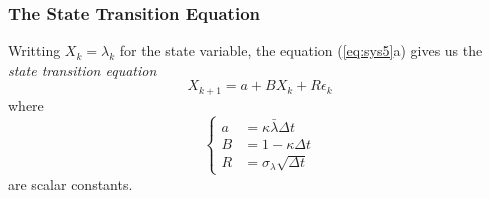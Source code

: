 \documentclass{article}
\theoremstyle{definition}
\theoremstyle{remark}
\begin{document}
\subsubsection{The State Transition Equation}

Writting $X_k=\lambda_k$ for the state variable, the equation (\ref{eq:sys5}a) gives us the \textit{state transition equation}
\begin{equation}\label{eq:driftstate}
\boxed{X_{k+1}= a+BX_k+R\epsilon_k} %
\end{equation}
where %
\begin{equation}
\left\{ \begin{array}{ll}
          a & = \kappa \bar{\lambda} \Delta t \\ 
          B & = 1-\kappa \Delta t \\ 
          R & = \sigma_\lambda \sqrt{\Delta t}
        \end{array} \right. 
\end{equation}
are scalar constants.
\end{document}
